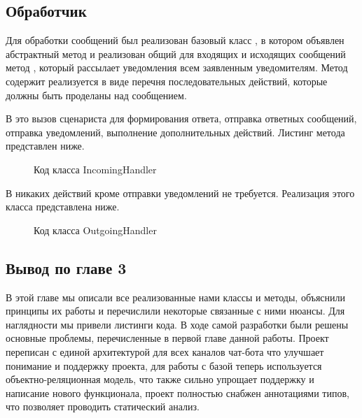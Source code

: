     \subsection{Обработчик}
    Для обработки сообщений был реализован базовый класс , в котором объявлен
    абстрактный метод  и реализован общий для входящих и исходящих сообщений
    метод , который рассылает уведомления всем заявленным уведомителям.
    Метод  содержит реализуется в виде перечня последовательных действий,
    которые должны быть проделаны над сообщением.

    В  это вызов сценариста для формирования ответа, отправка ответных сообщений,
    отправка уведомлений, выполнение дополнительных действий. Листинг метода представлен ниже.

    \begin{figure}[!h]
        \centering
        
        \caption{Код класса IncomingHandler}
        \label{fig:incomig_handler_handle}
    \end{figure}

    В  никаких действий кроме отправки уведомлений не требуется.
    Реализация этого класса представлена ниже.

    \begin{figure}[!h]
        \centering
        
        \caption{Код класса OutgoingHandler}
        \label{fig:outgoing_handler}
    \end{figure}

    \subsection*{Вывод по главе 3}
    В этой главе мы описали все реализованные нами классы и методы, объяснили принципы
    их работы и перечислили некоторые связанные с ними нюансы.
    Для наглядности мы привели листинги кода.
    В ходе самой разработки были решены основные проблемы, перечисленные в первой главе данной работы.
    Проект переписан с единой архитектурой для всех каналов чат-бота что улучшает понимание и поддержку
    проекта, для работы с базой теперь используется объектно-реляционная модель, что также сильно
    упрощает поддержку и написание нового функционала,
    проект полностью снабжен аннотациями типов, что позволяет проводить статический анализ.
